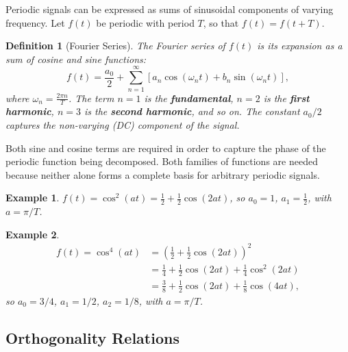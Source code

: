 \documentclass{article}
\newtheorem{definition}{Definition}
\newtheorem*{example}{Example}
\begin{document}
Periodic signals can be expressed as sums of sinusoidal components of varying frequency. Let $f(t)$ be periodic with period $T$, so that $f(t) = f(t+T)$.

\begin{definition}[Fourier Series]
    The Fourier series of $f(t)$ is its expansion as a sum of cosine and sine functions:
    \[f(t) = \frac{a_0}{2} + \sum_{n=1}^{\infty}\left[a_n\cos(\omega_n t) + b_n\sin(\omega_n t)\right],\]
    where $\omega_n = \frac{2\pi n}{T}$. The term $n = 1$ is the \textbf{fundamental}, $n = 2$ is the \textbf{first harmonic}, $n = 3$ is the \textbf{second harmonic}, and so on. The constant $a_0/2$ captures the non-varying (DC) component of the signal.
\end{definition}

Both sine and cosine terms are required in order to capture the phase of the periodic function being decomposed. Both families of functions are needed because neither alone forms a complete basis for arbitrary periodic signals.

\begin{example}
    $f(t) = \cos^2(at) = \tfrac{1}{2} + \tfrac{1}{2}\cos(2at)$, so $a_0 = 1$, $a_1 = \tfrac{1}{2}$, with $a = \pi/T$.
\end{example}

\begin{example}
    \begin{align*}
        f(t) = \cos^4(at) &= \left(\tfrac{1}{2} + \tfrac{1}{2}\cos(2at)\right)^2 \\
                          &= \tfrac{1}{4} + \tfrac{1}{2}\cos(2at) + \tfrac{1}{4}\cos^2(2at) \\
                          &= \tfrac{3}{8} + \tfrac{1}{2}\cos(2at) + \tfrac{1}{8}\cos(4at),
    \end{align*}
    so $a_0 = 3/4$, $a_1 = 1/2$, $a_2 = 1/8$, with $a = \pi/T$.
\end{example}

\subsection{Orthogonality Relations}
\end{document}
